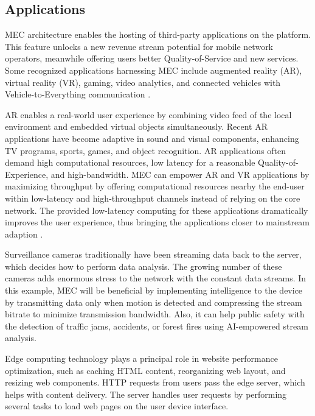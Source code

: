 \subsection{Applications}
\label{subs:applications}

MEC architecture enables the hosting of third-party applications on the platform. This feature unlocks a new revenue stream potential for mobile network operators, meanwhile offering users better Quality-of-Service and new services. Some recognized applications harnessing MEC include augmented reality (AR), virtual reality (VR), gaming, video analytics, and connected vehicles with Vehicle-to-Everything communication \cite{Sprecher2020}.

AR enables a real-world user experience by combining video feed of the local environment and embedded virtual objects simultaneously. Recent AR applications have become adaptive in sound and visual components, enhancing TV programs, sports, games, and object recognition. AR applications often demand high computational resources, low latency for a reasonable Quality-of-Experience, and high-bandwidth. MEC can empower AR and VR applications by maximizing throughput by offering computational resources nearby the end-user within low-latency and high-throughput channels instead of relying on the core network. The provided low-latency computing for these applications dramatically improves the user experience, thus bringing the applications closer to mainstream adaption \cite{Sprecher2020}. \cite{Abbas2018}

Surveillance cameras traditionally have been streaming data back to the server, which decides how to perform data analysis. The growing number of these cameras adds enormous stress to the network with the constant data streams. In this example, MEC will be beneficial by implementing intelligence to the device by transmitting data only when motion is detected and compressing the stream bitrate to minimize transmission bandwidth. Also, it can help public safety with the detection of traffic jams, accidents, or forest fires using AI-empowered stream analysis.

Edge computing technology plays a principal role in website performance optimization, such as caching HTML content, reorganizing web layout, and resizing web components. HTTP requests from users pass the edge server, which helps with content delivery. The server handles user requests by performing several tasks to load web pages on the user device interface. \cite{Abbas2018}

